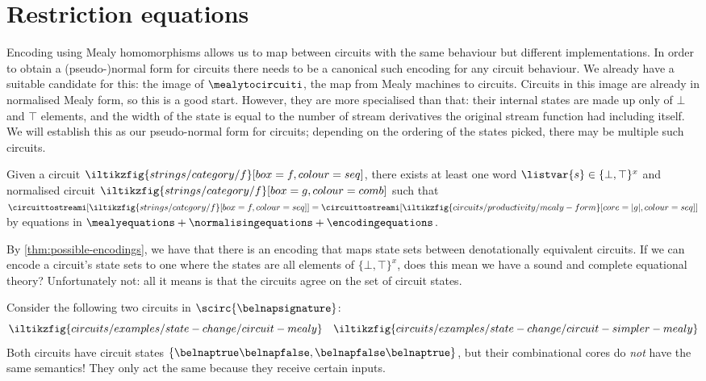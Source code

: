 \section{Restriction equations}

Encoding using Mealy homomorphisms allows us to map between circuits with the
same behaviour but different implementations.
In order to obtain a (pseudo-)normal form for circuits there needs to be a
canonical such encoding for any circuit behaviour.
We already have a suitable candidate for this: the image of
\(\mealytocircuiti\), the map from Mealy machines to circuits.
Circuits in this image are already in normalised Mealy form, so this is a good
start.
However, they are more specialised than that: their internal states are made up
only of \(\bot\) and \(\top\) elements, and the width of the state is equal to
the number of stream derivatives the original stream function had including
itself.
We will establish this as our pseudo-normal form for circuits; depending on the
ordering of the states picked, there may be multiple such circuits.

\begin{corollary}
    Given a circuit \(
    \iltikzfig{strings/category/f}[box=f,colour=seq]
    \), there exists at least one word \(\listvar{s} \in \{\bot,\top\}^x\) and
    normalised circuit \(
    \iltikzfig{strings/category/f}[box=g,colour=comb]
    \) such that \(
    \circuittostreami[\iltikzfig{strings/category/f}[box=f,colour=seq]]
    =
    \circuittostreami[\iltikzfig{circuits/productivity/mealy-form}[core=|g|,colour=seq]]
    \) by equations in \(
    \mealyequations + \normalisingequations + \encodingequations
    \).
\end{corollary}

By \cref{thm:possible-encodings}, we have that there is an encoding that maps
state sets between denotationally equivalent circuits.
If we can encode a circuit's state sets to one where the states are all elements
of \(\{\bot,\top\}^x\), does this mean we have a sound and complete equational
theory?
Unfortunately not: all it means is that the circuits agree on the set of
circuit states.

\begin{example}\label{ex:restriction-example}
    Consider the following two circuits in \(\scirc{\belnapsignature}\): \[
        \iltikzfig{circuits/examples/state-change/circuit-mealy}
        \quad
        \iltikzfig{circuits/examples/state-change/circuit-simpler-mealy}
    \]
    Both circuits have circuit states \(
    \{\belnaptrue\belnapfalse,\belnapfalse\belnaptrue\}
    \), but their combinational cores do \emph{not} have the same semantics!
    They only act the same because they receive certain inputs.
\end{example}

